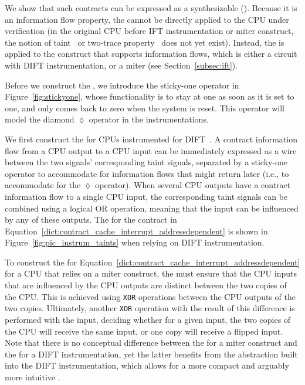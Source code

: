 
We show that such contracts can be expressed as a synthesizable \pici (\PICI).
Because it is an information flow property, the \PICI cannot be directly applied to the CPU under verification (in the original CPU before IFT instrumentation or miter construct, the notion of taint~\cite{solt2022cellift,ceesay2024mucfi} or two-trace property~\cite{wang2023specification,dinesh2024conjunct,dinesh2024conjunct,tan2025contractshadowlogic} does not yet exist).
Instead, the \PICI is applied to the construct that supports information flows, which is either a circuit with DIFT instrumentation, or a miter (see Section~\ref{subsec:ift}).

Before we construct the \PICI, we introduce the sticky-one operator in Figure~\ref{fig:stickyone}, whose functionality is to stay at one as soon as it is set to one, and only comes back to zero when the system is reset.
This operator will model the diamond $\lozenge$ operator in the instrumentations.

We first construct the \PICI for CPUs instrumented for DIFT~\cite{tiwari2009complete,solt2022cellift}.
A contract information flow from a CPU output to a CPU input can be immediately expressed as a wire between the two signals' corresponding taint signals, separated by a sticky-one operator to accommodate for information flows that might return later (i.e., to accommodate for the $\lozenge$ operator).
When several CPU outputs have a contract information flow to a single CPU input, the corresponding taint signals can be combined using a logical OR operation, meaning that the input can be influenced by any of these outputs.
The \PICI for the contract in Equation~\ref{dict:contract_cache_interrupt_addressdependent} is shown in Figure~\ref{fig:pic_instrum_taints} when relying on DIFT instrumentation.

To construct the \PICI for Equation~\ref{dict:contract_cache_interrupt_addressdependent} for a CPU that relies on a miter construct, the \PICI must ensure that the CPU inputs that are influenced by the CPU outputs are distinct between the two copies of the CPU.
This is achieved using \texttt{XOR} operations between the CPU outputs of the two copies.
Ultimately, another \texttt{XOR} operation with the result of this difference is performed with the input, deciding whether for a given input, the two copies of the CPU will receive the same input, or one copy will receive a flipped input.
Note that there is no conceptual difference between the \PICI for a miter construct and the \PICI for a DIFT instrumentation, yet the latter benefits from the abstraction built into the DIFT instrumentation, which allows for a more compact and arguably more intuitive \PICI.

